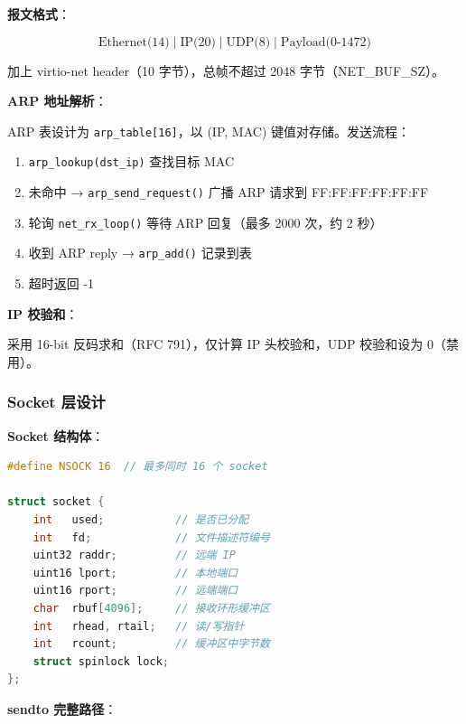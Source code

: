 \documentclass[12pt,a4paper]{ctexart}
\begin{document}
\textbf{报文格式}：

\[
\boxed{\text{Ethernet(14)} \mid \text{IP(20)} \mid \text{UDP(8)} \mid \text{Payload(0-1472)}}
\]

加上 virtio-net header（10 字节），总帧不超过 2048 字节（NET\_BUF\_SZ）。

\textbf{ARP 地址解析}：

ARP 表设计为 \texttt{arp\_table[16]}，以 (IP, MAC) 键值对存储。发送流程：

\begin{enumerate}
  \item \texttt{arp\_lookup(dst\_ip)} 查找目标 MAC
  \item 未命中 → \texttt{arp\_send\_request()} 广播 ARP 请求到 FF:FF:FF:FF:FF:FF
  \item 轮询 \texttt{net\_rx\_loop()} 等待 ARP 回复（最多 2000 次，约 2 秒）
  \item 收到 ARP reply → \texttt{arp\_add()} 记录到表
  \item 超时返回 -1
\end{enumerate}

\textbf{IP 校验和}：

采用 16-bit 反码求和（RFC 791），仅计算 IP 头校验和，UDP 校验和设为 0（禁用）。

\subsubsection{Socket 层设计}

\textbf{Socket 结构体}：

\begin{lstlisting}[language=C, caption={Socket 结构体（kernel/sysnet.c）}]
#define NSOCK 16  // 最多同时 16 个 socket

struct socket {
    int   used;           // 是否已分配
    int   fd;             // 文件描述符编号
    uint32 raddr;         // 远端 IP
    uint16 lport;         // 本地端口
    uint16 rport;         // 远端端口
    char  rbuf[4096];     // 接收环形缓冲区
    int   rhead, rtail;   // 读/写指针
    int   rcount;         // 缓冲区中字节数
    struct spinlock lock;
};
\end{lstlisting}

\textbf{sendto 完整路径}：
\end{document}
